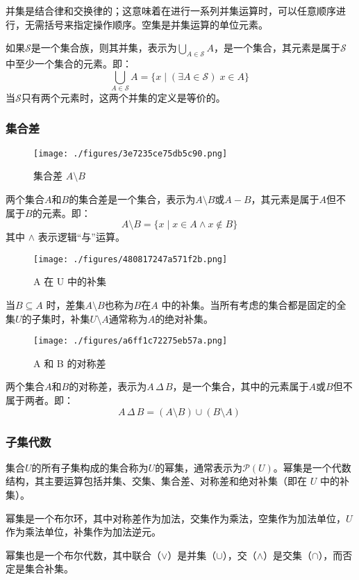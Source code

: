 并集是结合律和交换律的；这意味着在进行一系列并集运算时，可以任意顺序进行，无需括号来指定操作顺序。空集是并集运算的单位元素。

如果\( \mathcal{S} \)是一个集合族，则其并集，表示为\( \bigcup_{A \in \mathcal{S}} A \)，是一个集合，其元素是属于\( \mathcal{S} \)中至少一个集合的元素。即：
\[
\bigcup_{A \in \mathcal{S}} A = \{x \mid (\exists A \in \mathcal{S})\; x \in A\}~
\]
当\( \mathcal{S} \)只有两个元素时，这两个并集的定义是等价的。
\subsubsection{集合差}
\begin{figure}[ht]
\centering
\texttt{[image: ./figures/3e7235ce75db5c90.png]}
\caption{集合差 \( A \setminus B \)} \label{fig_JHSX_6}
\end{figure}
两个集合\( A \)和\( B \)的集合差是一个集合，表示为\( A \setminus B \)或\( A - B \)，其元素是属于\( A \)但不属于\( B \)的元素。即：
\[
A \setminus B = \{x \mid x \in A \land x \notin B\}~
\]
其中 \( \land \) 表示逻辑“与”运算。
\begin{figure}[ht]
\centering
\texttt{[image: ./figures/480817247a571f2b.png]}
\caption{A 在 U 中的补集} \label{fig_JHSX_7}
\end{figure}
当\( B \subseteq A \) 时，差集\( A \setminus B \)也称为\( B \)在\( A \) 中的补集。当所有考虑的集合都是固定的全集\( U \)的子集时，补集\( U \setminus A \)通常称为\( A \)的绝对补集。
\begin{figure}[ht]
\centering
\texttt{[image: ./figures/a6ff1c72275eb57a.png]}
\caption{A 和 B 的对称差} \label{fig_JHSX_8}
\end{figure}
两个集合\( A \)和\( B \)的对称差，表示为\( A \, \Delta \, B \)，是一个集合，其中的元素属于\( A \)或\( B \)但不属于两者。即：
\[
A \, \Delta \, B = (A \setminus B) \cup (B \setminus A)~
\]
\subsubsection{子集代数}
集合\( U \)的所有子集构成的集合称为\( U \)的幂集，通常表示为\( \mathcal{P}(U) \)。幂集是一个代数结构，其主要运算包括并集、交集、集合差、对称差和绝对补集（即在 \( U \) 中的补集）。

幂集是一个布尔环，其中对称差作为加法，交集作为乘法，空集作为加法单位，\( U \) 作为乘法单位，补集作为加法逆元。

幂集也是一个布尔代数，其中联合（\( \lor \)）是并集（\( \cup \)），交（\( \land \)）是交集（\( \cap \)），而否定是集合补集。


